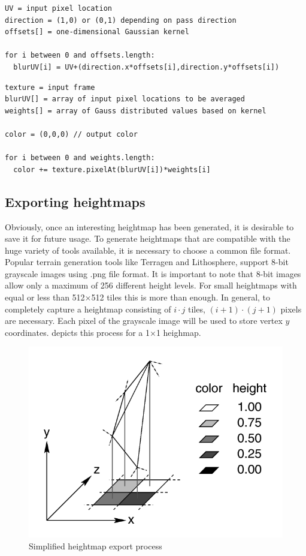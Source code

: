 \documentclass[11pt,a4paper,twoside,openright]{report}
\begin{document}
\newpage
\begin{lstlisting}[caption=Two-pass Gaussian filter vertex shader pseudocode, label=lst:gaussvert]
UV = input pixel location
direction = (1,0) or (0,1) depending on pass direction
offsets[] = one-dimensional Gaussian kernel

for i between 0 and offsets.length:
  blurUV[i] = UV+(direction.x*offsets[i],direction.y*offsets[i])
\end{lstlisting}

\begin{lstlisting}[caption=Two-pass Gaussian filter fragment shader pseudocode, label=lst:gaussfrag]
texture = input frame
blurUV[] = array of input pixel locations to be averaged
weights[] = array of Gauss distributed values based on kernel

color = (0,0,0) // output color

for i between 0 and weights.length:
  color += texture.pixelAt(blurUV[i])*weights[i]
\end{lstlisting}

\subsection{Exporting heightmaps}
\label{subsec:exportingheightmaps}
Obviously, once an interesting heightmap has been generated, it is desirable to save it for future usage. To generate heightmaps that are compatible with the huge variety of tools available, it is necessary to choose a common file format. Popular terrain generation tools like Terragen and Lithosphere, support 8-bit grayscale images using .png file format. It is important to note that 8-bit images allow only a maximum of 256 different height levels. For small heightmaps with equal or less than 512$\times$512 tiles this is more than enough. In general, to completely capture a heightmap consisting of $i \cdot j$ tiles, $(i+1) \cdot (j+1)$ pixels are necessary. Each pixel of the grayscale image will be used to store vertex $y$ coordinates.  depicts this process for a 1$\times$1 heighmap.

\begin{figure}[h]
\centering
\includegraphics[width=0.4\linewidth]{pixhfld.png}
\caption{
  Simplified heightmap export process \cite{POVRay:HeightField}
}
\label{fig:heightfield}
\end{figure}
\end{document}
